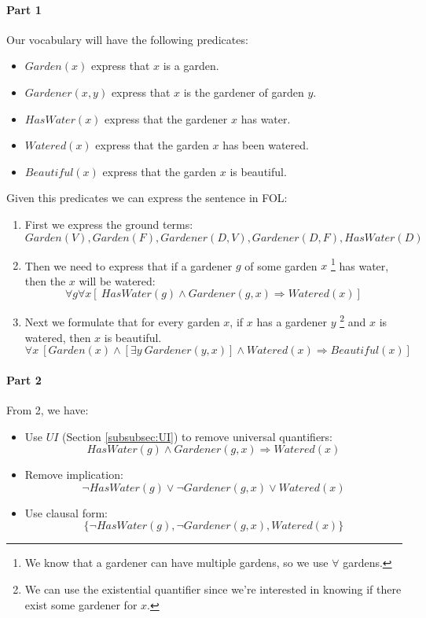 \documentclass[10pt,a4paper]{article}
\begin{document}
\paragraph{Part 1}
Our vocabulary will have the following predicates:
\begin{itemize}
\item $Garden(x)$ express that $x$ is a garden.
\item $Gardener(x,y)$ express that $x$ is the gardener of garden $y$.
\item $HasWater(x)$ express that the gardener $x$ has water.
\item $Watered(x)$ express that the garden $x$ has been watered.
\item $Beautiful(x)$ express that the garden $x$ is beautiful.
\end{itemize}

Given this predicates we can express the sentence in FOL:
\begin{enumerate}
\item First we express the ground terms:
\[ Garden(V), Garden(F), Gardener(D,V), Gardener(D,F), HasWater(D)\]
\item Then we need to express that if a gardener $g$ of some garden $x$ \footnote{We know that a gardener can have multiple gardens, so we use $\forall$ gardens.} has water, then the $x$ will be watered:
\[\forall g \forall x[\ HasWater(g)\wedge Gardener(g,x)\Rightarrow Watered(x)]\]
\item Next we formulate that for every garden $x$, if $x$ has a gardener $y$ \footnote{We can use the existential quantifier since we're interested in knowing if there exist some gardener for $x$. } and $x$ is watered, then $x$ is beautiful.
\[\forall x\ [Garden(x)\wedge [\exists y\ Gardener(y,x)]\wedge Watered(x)\Rightarrow Beautiful(x)]\]
\end{enumerate}

\paragraph{Part 2}

From 2, we have:
\begin{itemize}
\item Use $UI$ (Section \ref{subsubsec:UI}) to remove universal quantifiers:
\[ HasWater(g)\wedge Gardener(g,x)\Rightarrow Watered(x)\]
\item Remove implication:
\[\neg HasWater(g)\vee \neg Gardener(g,x)\vee Watered(x)\]
\item Use clausal form:
\[\lbrace \neg HasWater(g), \neg Gardener(g,x), Watered(x)\rbrace\]
\end{itemize}
\end{document}
